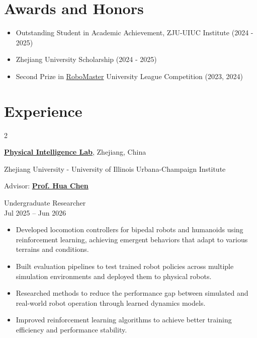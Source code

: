 \documentclass[10pt, letterpaper]{article}
\newenvironment{highlights}{
    \begin{itemize}[
        topsep=0.10 cm,
        parsep=0.10 cm,
        partopsep=0pt,
        itemsep=0pt,
        leftmargin=0 cm + 10pt
    ]
}{
    \end{itemize}
} %
\newenvironment{twocolentry}[2][]{
    \onecolentry
    \def\secondColumn{#2}
    \setcolumnwidth{\fill, 4.5 cm}
    \begin{paracol}{2}
}{
    \switchcolumn \raggedleft \secondColumn
    \end{paracol}
    \endonecolentry
} %
\begin{document}
    \section{Awards and Honors}

        \begin{highlights}
            \item Outstanding Student in Academic Achievement, ZJU-UIUC Institute (2024 - 2025)
            \item Zhejiang University Scholarship (2024 - 2025)
            \item Second Prize in \href{https://www.robomaster.com/en-US}{RoboMaster} University League Competition (2023, 2024)
        \end{highlights}
    
    \section{Experience}

        \begin{twocolentry} {
            Undergraduate Researcher \\
            Jul 2025 -- Jun 2026
        }
            \href{https://physicalintelligence-lab.github.io/}{\textbf{Physical Intelligence Lab}}, Zhejiang, China

            \vspace{0.05 cm}
            
            Zhejiang University - University of Illinois Urbana-Champaign Institute

            \vspace{0.05 cm}

            Advisor: \href{https://zjui.intl.zju.edu.cn/en/team/teacherinfo/2461}{\textbf{Prof. Hua Chen}} 
        \end{twocolentry}

        \vspace{0.10 cm}

        \begin{highlights}
            \item Developed locomotion controllers for bipedal robots and humanoids using reinforcement learning, achieving emergent behaviors that adapt to various terrains and conditions.
            \item Built evaluation pipelines to test trained robot policies across multiple simulation environments and deployed them to physical robots.
            \item Researched methods to reduce the performance gap between simulated and real-world robot operation through learned dynamics models.
            \item Improved reinforcement learning algorithms to achieve better training efficiency and performance stability.
        \end{highlights}
\end{document}
